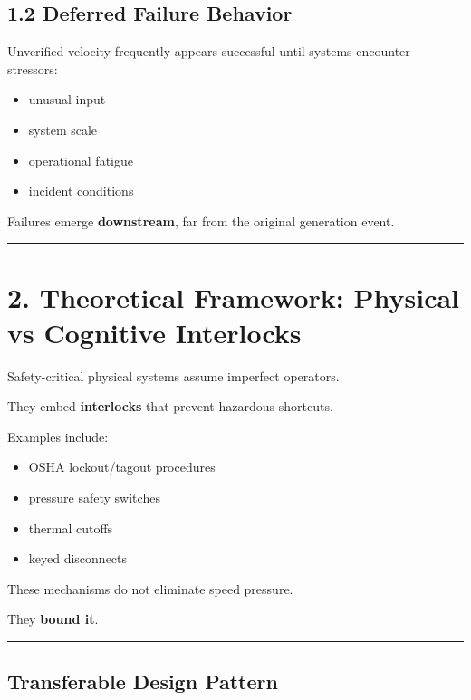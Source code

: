 \documentclass[
]{article}
\providecommand{\tightlist}{%
  \setlength{\itemsep}{0pt}\setlength{\parskip}{0pt}}
\begin{document}
\subsection{1.2 Deferred Failure
Behavior}\label{12-deferred-failure-behavior}

Unverified velocity frequently appears successful until systems
encounter stressors:

\begin{itemize}
\tightlist
\item
  unusual input
\item
  system scale
\item
  operational fatigue
\item
  incident conditions
\end{itemize}

Failures emerge \textbf{downstream}, far from the original generation
event.

\begin{center}\rule{0.5\linewidth}{0.5pt}\end{center}

\section{2. Theoretical Framework: Physical vs Cognitive
Interlocks}\label{2-theoretical-framework-physical-vs-cognitive-interlocks}

Safety-critical physical systems assume imperfect operators.

They embed \textbf{interlocks} that prevent hazardous shortcuts.

Examples include:

\begin{itemize}
\tightlist
\item
  OSHA lockout/tagout procedures
\item
  pressure safety switches
\item
  thermal cutoffs
\item
  keyed disconnects
\end{itemize}

These mechanisms do not eliminate speed pressure.

They \textbf{bound it}.

\begin{center}\rule{0.5\linewidth}{0.5pt}\end{center}

\subsection{Transferable Design
Pattern}\label{transferable-design-pattern}
\end{document}
